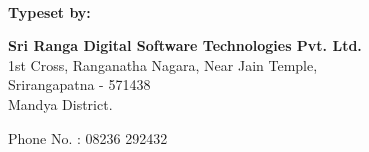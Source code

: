 ~
\thispagestyle{empty}
















\vfill

\bigskip

\noindent
{\rm\bfseries Typeset by:}
\medskip

\noindent
{\rm\bfseries Sri Ranga Digital Software Technologies Pvt. Ltd.}\\[3pt]
{\rm 1st Cross, Ranganatha Nagara, Near Jain Temple,}\\
{\rm Srirangapatna - 571438}\\
{\rm Mandya District.}

\medskip
\noindent
{\rm Phone No. : 08236 292432}




